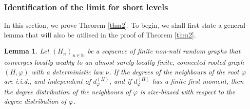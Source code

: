 \documentclass[11pt]{article}
\numberwithin{equation}{section}
\theoremstyle{plain}
\newtheorem{lemma}[theorem]{Lemma}
\newcommand{\N}{\mathbb N}
\begin{document}
\subsubsection{Identification of the limit for short levels}
In this section, we prove Theorem \ref{thm2}. To begin, we shall first state a general lemma that will also be utilised in the proof of Theorem \ref{thm2}.
\begin{lemma}\label{lem0}
Let $(H_{n})_{n\in\N}$ be a sequence of finite non-null random graphs that converges locally weakly to an almost surely locally finite, connected rooted graph $(H, \varphi)$ with a deterministic law $\nu$. If the degrees of the neighbours of the root $\varphi$ are i.i.d., and independent of $d_{\varphi}^{(H)}$, and if $d_{\varphi}^{(H)}$ has a finite first moment, then the degree distribution of the neighbours of $\varphi$ is size-biased with respect to the degree distribution of $\varphi$.
\end{lemma}
\end{document}
